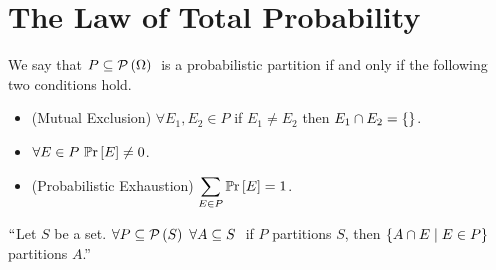     \section{The Law of Total Probability}
        \begin{definition}
            We say that $P \subseteq \mathcal{P}\left(\Omega\right) \ $ is a probabilistic partition
            if and only if the following two conditions hold.
            \begin{itemize}
                \item 
                    (Mutual Exclusion) $\forall E_1, E_2 \in P$ if $E_1 \neq E_2$ 
                    then $E_1 \cap E_2 = \left\{\right\}$.
                \item
                    $\forall E \in P \ \mathbb{P}\mathrm{r} \left[E\right] \neq 0$.
                \item
                    (Probabilistic Exhaustion) $\displaystyle\sum_{E \in P} \mathbb{P}\mathrm{r} \left[E\right] = 1$.
            \end{itemize}
        \end{definition}
        \begin{lemma}
            $``$Let $S$ be a set. $\forall P \subseteq \mathcal{P}\left(S\right) \  \forall A \subseteq S \ $ if $P$ partitions $S$, then
            $\left\{A \cap E \mid E \in P\right\}$ partitions $A$.''
            \label{LTP Partition Lemma}
        \end{lemma}
